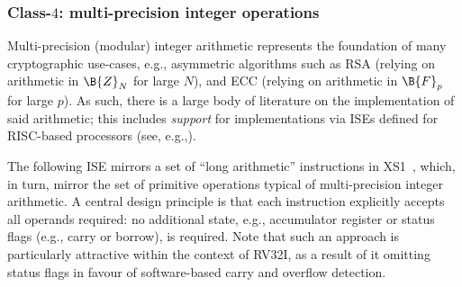 
\subsubsection{Class-$4$: multi-precision integer operations}
\label{sec:bg:feature:4}

Multi-precision (modular) integer arithmetic represents the foundation
of many cryptographic use-cases, e.g., asymmetric algorithms such as
RSA (relying on arithmetic in $\B{Z}_N$ for large $N$),
and
ECC (relying on arithmetic in $\B{F}_p$ for large $p$).
As such, there is a large body of literature on the implementation of
said arithmetic; this includes {\em support} for implementations via
ISEs defined for RISC-based processors
(see, e.g.,\cite{SCARV:GroKam:03,SCARV:GroKam:04}).

The following ISE mirrors a set of ``long arithmetic'' instructions in
XS1~\cite[Section 18]{SCARV:XS1:09}, which, in turn, mirror the set of
primitive operations typical of multi-precision integer arithmetic.  
A central design principle is that each instruction explicitly accepts 
all operands required: no additional state, e.g., accumulator register
or status flags (e.g., carry or borrow), is required.  Note that such
an approach is particularly attractive within the context of RV32I, as
a result of it omitting status flags in favour of software-based carry
and overflow detection.


